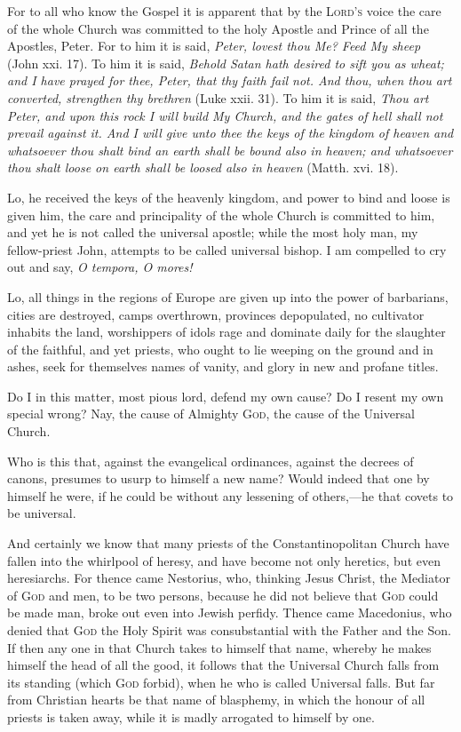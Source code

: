 For to all who know the Gospel it is apparent that by the \textsc{Lord’s} voice the care of the whole Church was committed to the holy Apostle and Prince of all the Apostles, Peter. For to him it is said, \emph{Peter, lovest thou Me? Feed My sheep} (John xxi. 17). To him it is said, \emph{Behold Satan hath desired to sift you as wheat; and I have prayed for thee, Peter, that thy faith fail not. And thou, when thou art converted, strengthen thy brethren} (Luke xxii. 31). To him it is said, \emph{Thou art Peter, and upon this rock I will build My Church, and the gates of hell shall not prevail against it. And I will give unto thee the keys of the kingdom of heaven and whatsoever thou shalt bind an earth shall be bound also in heaven; and whatsoever thou shalt loose on earth shall be loosed also in heaven} (Matth. xvi. 18).

Lo, he received the keys of the heavenly kingdom, and power to bind and loose is given him, the care and principality of the whole Church is committed to him, and yet he is not called the universal apostle; while the most holy man, my fellow-priest John, attempts to be called universal bishop. I am compelled to cry out and say, \emph{O tempora, O mores!}

Lo, all things in the regions of Europe are given up into the power of barbarians, cities are destroyed, camps overthrown, provinces depopulated, no cultivator inhabits the land, worshippers of idols rage and dominate daily for the slaughter of the faithful, and yet priests, who ought to lie weeping on the ground and in ashes, seek for themselves names of vanity, and glory in new and profane titles.

Do I in this matter, most pious lord, defend my own cause? Do I resent my own special wrong? Nay, the cause of Almighty \textsc{God}, the cause of the Universal Church.

Who is this that, against the evangelical ordinances, against the decrees of canons, presumes to usurp to himself a new name? Would indeed that one by himself he were, if he could be without any lessening of others,—he that covets to be universal.

And certainly we know that many priests of the Constantinopolitan Church have fallen into the whirlpool of heresy, and have become not only heretics, but even heresiarchs. For thence came Nestorius, who, thinking Jesus Christ, the Mediator of \textsc{God} and men, to be two persons, because he did not believe that \textsc{God} could be made man, broke out even into Jewish perfidy. Thence came Macedonius, who denied that \textsc{God} the Holy Spirit was consubstantial with the Father and the Son. If then any one in that Church takes to himself that name, whereby he makes himself the head of all the good, it follows that the Universal Church falls from its standing (which \textsc{God} forbid), when he who is called Universal falls. But far from Christian hearts be that name of blasphemy, in which the honour of all priests is taken away, while it is madly arrogated to himself by one.

